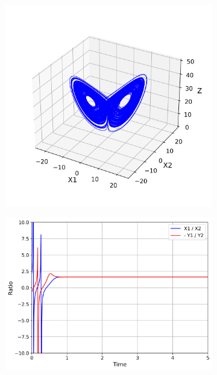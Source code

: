 \documentclass[paper=a4, fontsize=11pt]{scrartcl}
\numberwithin{equation}{section}		%
\numberwithin{figure}{section}			%
\numberwithin{table}{section}				%
\begin{document}
\begin{figure}[hbt!]
	\centering
	\begin{subfigure}[b]{0.495\textwidth}
		\centering
		\includegraphics[width=\textwidth]{media/extendedattractor_seed_50.png}
		\caption{}
		\label{fig:sub2}
	\end{subfigure}
	\hfill
	\begin{subfigure}[b]{0.495\textwidth}
		\centering
		\includegraphics[width=\textwidth]{media/X1_X2_Y1_Y2_vs_time_seed_50.png}

\end{subfigure}
\end{figure}
\end{document}
